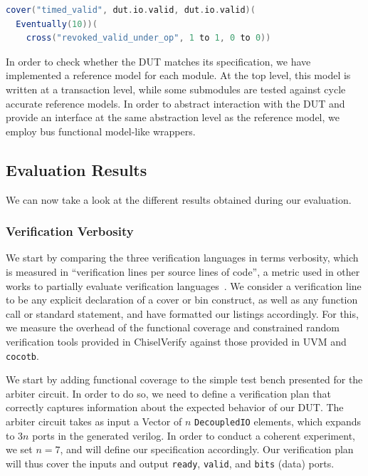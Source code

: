 \documentclass[conference]{IEEEtran}
\begin{document}
\begin{lstlisting}[language=scala, caption={A timed cover construct.}, label={lst:timedcover}]
cover("timed_valid", dut.io.valid, dut.io.valid)(
  Eventually(10))(
    cross("revoked_valid_under_op", 1 to 1, 0 to 0))
\end{lstlisting}

In order to check whether the DUT matches its specification, we have implemented a reference model for each module. 
At the top level, this model is written at a transaction level, while some submodules are tested against cycle accurate reference models.
In order to abstract interaction with the DUT and provide an interface at the same abstraction level as the reference model, we employ bus functional model-like wrappers. 

\subsection{Evaluation Results}
We can now take a look at the different results obtained during our evaluation.
\subsubsection{Verification Verbosity}
We start by comparing the three verification languages in terms verbosity, which is measured in ``verification lines per source lines of code'', a metric used in other works to partially evaluate verification languages~\cite{Nagini:2018, MuellerSchwerhoffSummers16, dobisCoverage:ETS22}.
We consider a verification line to be any explicit declaration of a cover or bin construct, as well as any function call or standard statement, and have formatted our listings accordingly.
For this, we measure the overhead of the functional coverage and constrained random verification tools provided in ChiselVerify against those provided in UVM and \texttt{cocotb}.

We start by adding functional coverage to the simple test bench presented for the arbiter circuit. 
In order to do so, we need to define a verification plan that correctly captures information about the expected behavior of our DUT.
The arbiter circuit takes as input a Vector of $n$ \texttt{DecoupledIO} elements, which expands to $3n$ ports in the generated verilog.
In order to conduct a coherent experiment, we set $n = 7$, and will define our specification accordingly.
Our verification plan will thus cover the inputs and output \texttt{ready}, \texttt{valid}, and \texttt{bits} (data) ports.
\end{document}
